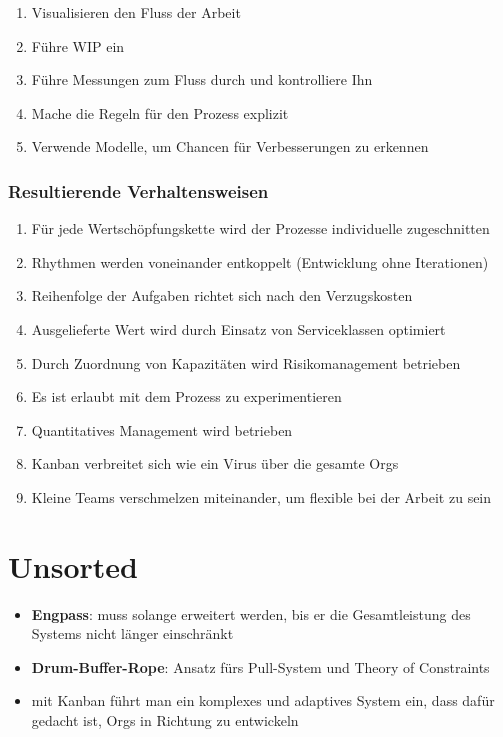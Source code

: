 
\begin{enumerate}
  \item Visualisieren den Fluss der Arbeit
  \item Führe WIP ein
  \item Führe Messungen zum Fluss durch und kontrolliere Ihn
  \item Mache die Regeln für den Prozess explizit
  \item Verwende Modelle, um Chancen für Verbesserungen zu erkennen
\end{enumerate}


\subsubsection{Resultierende Verhaltensweisen}
\begin{enumerate}
  \item Für jede Wertschöpfungskette wird der Prozesse individuelle zugeschnitten
  \item Rhythmen werden voneinander entkoppelt (Entwicklung ohne Iterationen)
  \item Reihenfolge der Aufgaben richtet sich nach den Verzugskosten
  \item Ausgelieferte Wert wird durch Einsatz von Serviceklassen optimiert
  \item Durch Zuordnung von Kapazitäten wird Risikomanagement betrieben
  \item Es ist erlaubt mit dem Prozess zu experimentieren
  \item Quantitatives Management wird betrieben
  \item Kanban verbreitet sich wie ein Virus über die gesamte Orgs
  \item Kleine Teams verschmelzen miteinander, um flexible bei der Arbeit zu sein
\end{enumerate}

\section{Unsorted}
\begin{itemize}
  \item \textbf{Engpass}: muss solange erweitert werden, bis er die Gesamtleistung des Systems nicht
    länger einschränkt
  \item \textbf{Drum-Buffer-Rope}: Ansatz fürs Pull-System und Theory of Constraints
  \item mit Kanban führt man ein komplexes und adaptives System ein, dass dafür gedacht ist, Orgs in
    Richtung  zu entwickeln
\end{itemize}



